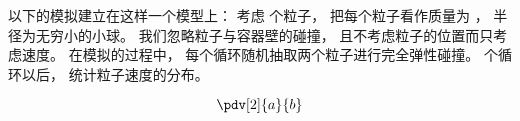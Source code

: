 
以下的模拟建立在这样一个模型上： 考虑  个粒子， 把每个粒子看作质量为 ， 半径为无穷小的小球。 我们忽略粒子与容器壁的碰撞， 且不考虑粒子的位置而只考虑速度。 在模拟的过程中， 每个循环随机抽取两个粒子进行完全弹性碰撞。  个循环以后， 统计粒子速度的分布。

\begin{equation}
\pdv[2]{a}{b}
\end{equation}

